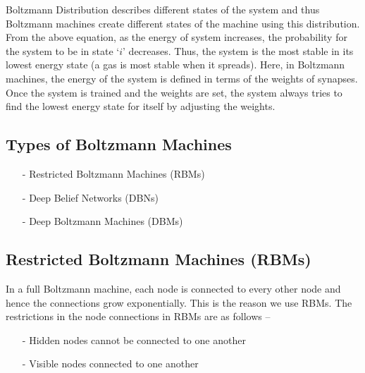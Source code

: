 Boltzmann Distribution describes different states of the system and thus Boltzmann 
machines create different states of the machine using this distribution. From the 
above equation, as the energy of system increases, the probability for the system 
to be in state ‘$i$’ decreases. Thus, the system is the most stable in its lowest 
energy state (a gas is most stable when it spreads). Here, in Boltzmann machines, 
the energy of the system is defined in terms of the weights of synapses. Once the 
system is trained and the weights are set, the system always tries to find the 
lowest energy state for itself by adjusting the weights.


\subsection{Types of Boltzmann Machines}

\begin{itemize}
\setlength{\parskip}{0pt}
\item[-]
Restricted Boltzmann Machines (RBMs)

\item[-]
Deep Belief Networks (DBNs)

\item[-]
Deep Boltzmann Machines (DBMs)
\end{itemize}


\subsection{Restricted Boltzmann Machines (RBMs)}

In a full Boltzmann machine, each node is connected to every other node and hence the 
connections grow exponentially. This is the reason we use RBMs. The restrictions in 
the node connections in RBMs are as follows –
\begin{itemize}
\setlength{\parskip}{0pt}
\item[-]
Hidden nodes cannot be connected to one another

\item[-]
Visible nodes connected to one another
\end{itemize}





